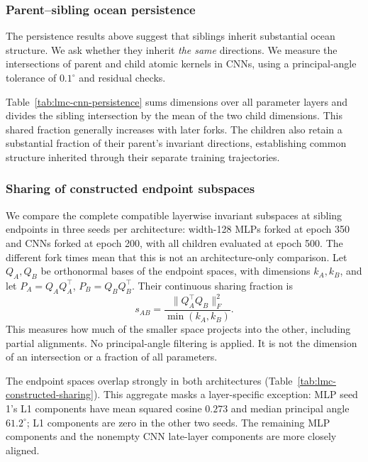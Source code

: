 \FloatBarrier
\subsubsection{Parent--sibling ocean persistence}
\label{app:sibling-persistence}
The persistence results above suggest that siblings inherit substantial ocean structure. We ask whether they inherit \emph{the same} directions. We measure the intersections of parent and child atomic kernels in CNNs, using a principal-angle tolerance of $0.1^\circ$ and residual checks.

Table~\ref{tab:lmc-cnn-persistence} sums dimensions over all parameter layers and divides the sibling intersection by the mean of the two child dimensions. This shared fraction generally increases with later forks. The children also retain a substantial fraction of their parent's invariant directions, establishing common structure inherited through their separate training trajectories.


\subsubsection{Sharing of constructed endpoint subspaces}
\label{app:lmc-shared}
We compare the complete compatible layerwise invariant subspaces at sibling endpoints in three seeds per architecture: width-128 MLPs forked at epoch 350 and CNNs forked at epoch 200, with all children evaluated at epoch 500. The different fork times mean that this is not an architecture-only comparison. Let $Q_A,Q_B$ be orthonormal bases of the endpoint spaces, with dimensions $k_A,k_B$, and let $P_A=Q_AQ_A^\top$, $P_B=Q_BQ_B^\top$. Their continuous sharing fraction is
\[
 s_{AB}=\frac{\|Q_A^\top Q_B\|_F^2}{\min(k_A,k_B)}.
\]
This measures how much of the smaller space projects into the other, including partial alignments. No principal-angle filtering is applied. It is not the dimension of an intersection or a fraction of all parameters.

The endpoint spaces overlap strongly in both architectures (Table~\ref{tab:lmc-constructed-sharing}). This aggregate masks a layer-specific exception: MLP seed 1's L1 components have mean squared cosine $0.273$ and median principal angle $61.2^\circ$; L1 components are zero in the other two seeds. The remaining MLP components and the nonempty CNN late-layer components are more closely aligned.








